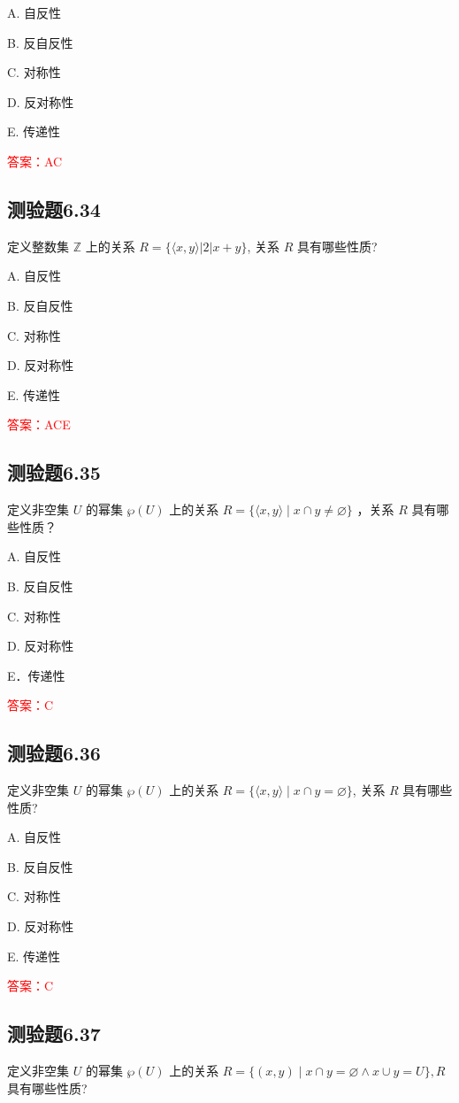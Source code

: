 \documentclass[UTF8, heading=true]{ctexart}
\begin{document}
A. 
自反性

B. 
反自反性

C. 
对称性

D. 
反对称性

E. 
传递性

\textcolor{red}{答案：AC}

\subsection{测验题6.34}

定义整数集 $\mathbb{Z}$ 上的关系 $R=\{\langle x, y\rangle|2| x+y\}$, 关系 $R$ 具有哪些性质?

A. 
自反性

B. 
反自反性

C. 
对称性

D. 
反对称性

E. 
传递性

\textcolor{red}{答案：ACE}

\subsection{测验题6.35}

定义非空集 $U$ 的幂集 $\wp(U)$ 上的关系 $R=\{\langle x, y\rangle \mid x \cap y \neq \varnothing\}$ ，关系 $R$ 具有哪些性质？

A. 自反性

B. 反自反性

C. 对称性

D. 反对称性

E．传递性

\textcolor{red}{答案：C}


\subsection{测验题6.36}
定义非空集 $U$ 的幂集 $\wp(U)$ 上的关系 $R=\{\langle x, y\rangle \mid x \cap y=\varnothing\}$, 关系 $R$ 具有哪些性质?

A. 
自反性

B. 
反自反性

C. 
对称性

D. 
反对称性

E. 
传递性

\textcolor{red}{答案：C}

\subsection{测验题6.37}
定义非空集 $U$ 的幂集 $\wp(U)$ 上的关系 $R=\{(x, y) \mid x \cap y=\varnothing \wedge x \cup y=U\}, R$ 具有哪些性质?
\end{document}
